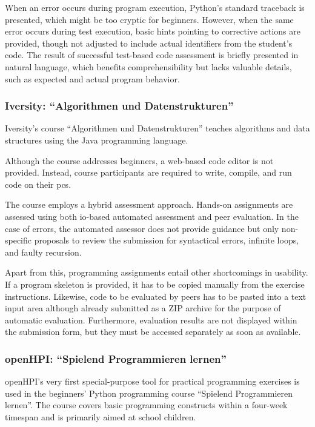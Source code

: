 When an error occurs during program execution, Python's standard traceback is presented, which might be too cryptic for beginners. However, when the same error occurs during test execution, basic hints pointing to corrective actions are provided, though not adjusted to include actual identifiers from the student's code. The result of successful test-based code assessment is briefly presented in natural language, which benefits comprehensibility but lacks valuable details, such as expected and actual program behavior.

\subsubsection{Iversity: \texorpdfstring{“Algorithmen und Datenstrukturen”}{Algorithmen und Datenstrukturen}}

Iversity's course ``Algorithmen und Datenstrukturen'' teaches algorithms and data structures using the Java programming language.

Although the course addresses beginners, a web-based code editor is not provided. Instead, course participants are required to write, compile, and run code on their \glspl{pc}.

The course employs a hybrid assessment approach. Hands-on assignments are assessed using both \gls{io}-based automated assessment and peer evaluation. In the case of errors, the automated assessor does not provide guidance but only non-specific proposals to review the submission for syntactical errors, infinite loops, and faulty recursion.

Apart from this, programming assignments entail other shortcomings in usability. If a program skeleton is provided, it has to be copied manually from the exercise instructions. Likewise, code to be evaluated by peers has to be pasted into a text input area although already submitted as a ZIP archive for the purpose of automatic evaluation. Furthermore, evaluation results are not displayed within the submission form, but they must be accessed separately as soon as available.

\subsubsection{openHPI: \texorpdfstring{“Spielend Programmieren lernen”}{Spielend Programmieren lernen}}

openHPI's very first special-purpose tool for practical programming exercises is used in the beginners' Python programming course ``Spielend Programmieren lernen''. The course covers basic programming constructs within a four-week timespan and is primarily aimed at school children.

